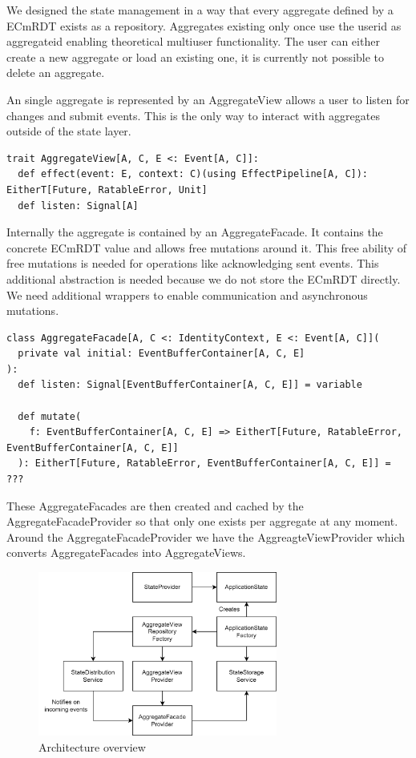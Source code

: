 \documentclass[
	ngerman,
	ruledheaders=section,   %
	class=report,		    %
	thesis={type=bachelor}, %
	accentcolor=9c,			%
	custommargins=true,    %
	marginpar=false,        %
	parskip=half-,          %
	fontsize=11pt,          %
]{tudapub}
\begin{document}
We designed the state management in a way that every aggregate defined by a ECmRDT exists as a repository. Aggregates existing only once use the userid as aggregateid enabling theoretical multiuser functionality. The user can either create a new aggregate or load an existing one, it is currently not possible to delete an aggregate. 

An single aggregate is represented by an AggregateView allows a user to listen for changes and submit events. This is the only way to interact with aggregates outside of the state layer.

\begin{lstlisting}
trait AggregateView[A, C, E <: Event[A, C]]:
  def effect(event: E, context: C)(using EffectPipeline[A, C]): EitherT[Future, RatableError, Unit]
  def listen: Signal[A]
\end{lstlisting}

Internally the aggregate is contained by an AggregateFacade. It contains the concrete ECmRDT value and allows free mutations around it. This free ability of free mutations is needed for operations like acknowledging sent events. This additional abstraction is needed because we do not store the ECmRDT directly. We need additional wrappers to enable communication and asynchronous mutations. 

\begin{lstlisting}
class AggregateFacade[A, C <: IdentityContext, E <: Event[A, C]](
  private val initial: EventBufferContainer[A, C, E]
):
  def listen: Signal[EventBufferContainer[A, C, E]] = variable

  def mutate(
    f: EventBufferContainer[A, C, E] => EitherT[Future, RatableError, EventBufferContainer[A, C, E]]
  ): EitherT[Future, RatableError, EventBufferContainer[A, C, E]] = ???

\end{lstlisting}

These AggregateFacades are then created and cached by the AggregateFacadeProvider so that only one exists per aggregate at any moment. Around the AggregateFacadeProvider we have the AggreagteViewProvider which converts AggregateFacades into AggregateViews. 

\begin{figure}[h]
  \centering
  \includegraphics[width=0.7\textwidth]{state.png}
  \caption{Architecture overview}
\end{figure}
\end{document}
